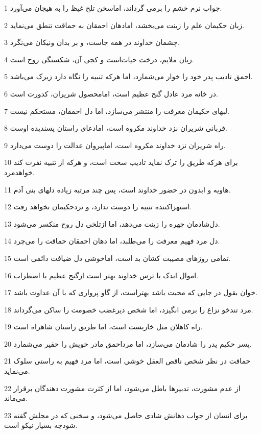 \par 1 جواب نرم خشم را برمی گرداند، اماسخن تلخ غیظ را به هیجان می‌آورد.
\par 2 زبان حکیمان علم را زینت می‌بخشد، امادهان احمقان به حماقت تنطق می‌نماید.
\par 3 چشمان خداوند در همه جاست، و بر بدان ونیکان می‌نگرد.
\par 4 زبان ملایم، درخت حیات‌است و کجی آن، شکستگی روح است.
\par 5 احمق تادیب پدر خود را خوار می‌شمارد، اما هر‌که تنبیه را نگاه دارد زیرک می‌باشد.
\par 6 در خانه مرد عادل گنج عظیم است، امامحصول شریران، کدورت است.
\par 7 لبهای حکیمان معرفت را منتشر می‌سازد، اما دل احمقان، مستحکم نیست.
\par 8 قربانی شریران نزد خداوند مکروه است، امادعای راستان پسندیده اوست.
\par 9 راه شریران نزد خداوند مکروه است، اماپیروان عدالت را دوست می‌دارد.
\par 10 برای هر‌که طریق را ترک نماید تادیب سخت است، و هر‌که از تنبیه نفرت کند خواهدمرد.
\par 11 هاویه و ابدون در حضور خداوند است، پس چند مرتبه زیاده دلهای بنی آدم.
\par 12 استهزاکننده تنبیه را دوست ندارد، و نزدحکیمان نخواهد رفت.
\par 13 دل‌شادمان چهره را زینت می‌دهد، اما ازتلخی دل روح منکسر می‌شود.
\par 14 دل مرد فهیم معرفت را می‌طلبد، اما دهان احمقان حماقت را می‌چرد.
\par 15 تمامی روزهای مصیبت کشان بد است، اماخوشی دل ضیافت دائمی است.
\par 16 اموال اندک با ترس خداوند بهتر است ازگنج عظیم با اضطراب.
\par 17 خوان بقول در جایی که محبت باشد بهتراست، از گاو پرواری که با آن عداوت باشد.
\par 18 مرد تندخو نزاع را برمی انگیزد، اما شخص دیرغضب خصومت را ساکن می‌گرداند.
\par 19 راه کاهلان مثل خاربست است، اما طریق راستان شاهراه است.
\par 20 پسر حکیم پدر را شادمان می‌سازد، اما مرداحمق مادر خویش را حقیر می‌شمارد.
\par 21 حماقت در نظر شخص ناقص العقل خوشی است، اما مرد فهیم به راستی سلوک می‌نماید.
\par 22 از عدم مشورت، تدبیرها باطل می‌شود، اما از کثرت مشورت دهندگان برقرار می‌ماند.
\par 23 برای انسان از جواب دهانش شادی حاصل می‌شود، و سخنی که در محلش گفته شودچه بسیار نیکو است.
